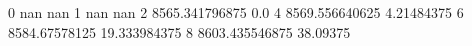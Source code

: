 0 nan nan
1 nan nan
2 8565.341796875 0.0
4 8569.556640625 4.21484375
6 8584.67578125 19.333984375
8 8603.435546875 38.09375
